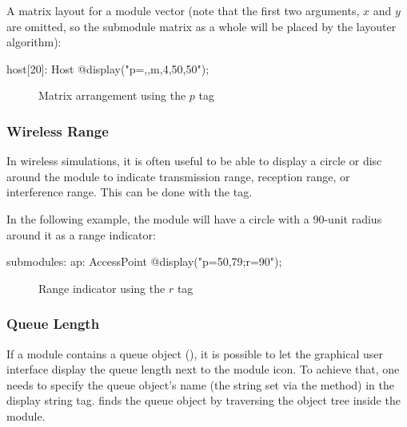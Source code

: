 A matrix layout for a module vector (note that the first two arguments, $x$
and $y$ are omitted, so the submodule matrix as a whole will be placed by
the layouter algorithm):

\begin{ned}
host[20]: Host {
    @display("p=,,m,4,50,50");
}
\end{ned}

\begin{figure}[htbp]
  \begin{center}
    \caption{Matrix arrangement using the $p$ tag}
    \label{fig:graphics-ptag}
  \end{center}
\end{figure}

\subsubsection{Wireless Range}
\label{sec:graphics:submodule-wireless-range}

In wireless simulations, it is often useful to be able to display a circle
or disc around the module to indicate transmission range, reception range,
or interference range. This can be done with the  tag.

In the following example, the module will have a circle with a 90-unit radius
around it as a range indicator:

\begin{ned}
submodules:
    ap: AccessPoint {
        @display("p=50,79;r=90");
    }
\end{ned}

\begin{figure}[htbp]
  \begin{center}
    \caption{Range indicator using the $r$ tag}
    \label{fig:graphics-rtag}
  \end{center}
\end{figure}

\subsubsection{Queue Length}
\label{sec:graphics:submodule-queue-length}

If a module contains a queue object (), it is possible to
let the graphical user interface display the queue length next to the
module icon. To achieve that, one needs to specify the queue object's name
(the string set via the  method) in the  display string tag.
{\opp} finds the queue object by traversing the object tree inside
the module.

